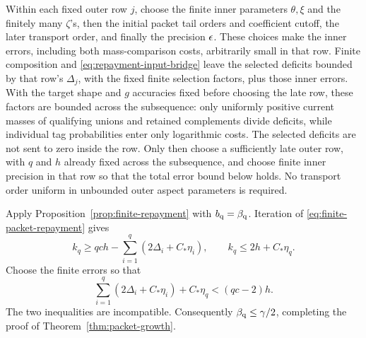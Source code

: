 Within each fixed outer row \(j\), choose the finite inner parameters
\(\theta,\xi\) and the finitely many \(\zeta\)'s, then the initial
packet tail orders and coefficient cutoff, the later transport order,
and finally the precision \(\epsilon\).  These choices make the inner
errors, including both mass-comparison costs, arbitrarily small in
that row.  Finite composition and
\eqref{eq:repayment-input-bridge} leave the selected deficits bounded
by that row's \(\Delta_j\), with the fixed finite selection factors,
plus those inner errors.  With the target shape and \(g\) accuracies
fixed before choosing the late row, these factors are bounded across
the subsequence: only uniformly positive current masses of qualifying
unions and retained complements divide deficits, while individual
tag probabilities enter only logarithmic costs.
The selected deficits are not sent to zero inside the row.
Only then choose a sufficiently late outer row, with \(q\) and \(h\)
already fixed across the subsequence, and choose finite inner precision
in that row so that the total error bound below holds.  No transport
order uniform in unbounded outer aspect parameters is required.

Apply Proposition~\ref{prop:finite-repayment} with
\(b_{\mathrm q}=\beta_{\mathrm q}\).
Iteration of \eqref{eq:finite-packet-repayment} gives
\[
 k_q\geq qch-\sum_{i=1}^q(2\Delta_i+C_*\eta_i),
 \qquad
 k_q\leq2h+C_*\eta_q.
\]
Choose the finite errors so that
\[
 \sum_{i=1}^q(2\Delta_i+C_*\eta_i)+C_*\eta_q
                  <(qc-2)h.
\]
The two inequalities are incompatible.
Consequently \(\beta_{\mathrm q}\leq\gamma/2\), completing the proof of
Theorem~\ref{thm:packet-growth}.
